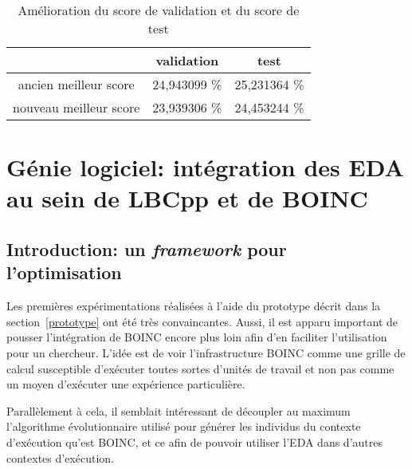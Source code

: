 \documentclass[a4paper, 11pt]{report}
\begin{document}
\begin{table}[htdp]
\caption{Amélioration du score de validation et du score de test}
\begin{center}
\begin{tabular}{|c|c|c|}
\hline
 & validation & test\\
\hline
ancien meilleur score & 24,943099 \% & 25,231364 \%\\
nouveau meilleur score & 23,939306 \% & 24,453244 \%\\
\hline
\end{tabular}
\end{center}
\label{tabimprove}
\end{table}%


\chapter{Génie logiciel: intégration des EDA au sein de LBCpp et de \textsc{BOINC}}
\label{genie}


\section{Introduction: un \textit{framework} pour l'optimisation}
\label{frameworkintro1}
Les premières expérimentations réalisées à l'aide du prototype décrit dans la section~\ref{prototype} ont été très convaincantes. Aussi, il est apparu important de pousser l'intégration de \textsc{BOINC} encore plus loin afin d'en faciliter l'utilisation pour un chercheur. L'idée est de voir l'infrastructure \textsc{BOINC} comme une grille de calcul susceptible d'exécuter toutes sortes d'unités de travail et non pas comme un moyen d'exécuter une expérience particulière.

Parallèlement à cela, il semblait intéressant de découpler au maximum l'algorithme évolutionnaire utilisé pour générer les individus du contexte d'exécution qu'est \textsc{BOINC}, et ce afin de pouvoir utiliser l'EDA dans d'autres contextes d'exécution.
\end{document}
